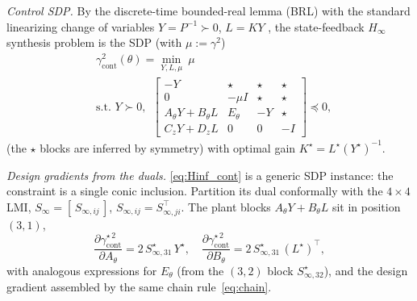 \documentclass[twocolumn,amsthm]{autart}
\begin{document}
\emph{Control SDP.} By the discrete-time bounded-real lemma (BRL) with the standard
linearizing change of variables $Y = P^{-1}\succ 0$, $L = KY$
\cite{boyd1994linear,grigoriadis1998integrate}, the state-feedback $H_\infty$
synthesis problem is the SDP (with $\mu := \gamma^2$)
\begin{equation}\label{eq:Hinf_cont}
\begin{aligned}
&\gamma^2_{\mathrm{cont}}(\theta) = \min_{Y,L,\mu}\ \mu \\
&\text{s.t. }  Y \succ 0,\ \
\begin{bmatrix}
-Y & \star & \star & \star \\
0 & -\mu I & \star & \star \\
A_\theta Y + B_\theta L & E_\theta & -Y & \star \\
C_z Y + D_z L & 0 & 0 & -I
\end{bmatrix} \preceq 0,
\end{aligned}
\end{equation}
(the $\star$ blocks are inferred by symmetry) with optimal gain
$K^\star = L^\star (Y^\star)^{-1}$.

\emph{Design gradients from the duals.} \eqref{eq:Hinf_cont} is a generic SDP
instance: the constraint is a single conic inclusion. Partition its dual
conformally with the $4\times4$ LMI,
$S_{\infty} = [\,S_{\infty,ij}\,]$, $S_{\infty,ij}=S_{\infty,ji}^\top$. The plant blocks
$A_\theta Y + B_\theta L$ sit in position $(3,1)$,
\begin{equation}\label{eq:gradHinf}
\frac{\partial \gamma^{\star\,2}_{\mathrm{cont}}}{\partial A_\theta} = 2\,S_{\infty,31}^\star\,Y^\star,
\quad
\frac{\partial \gamma^{\star\,2}_{\mathrm{cont}}}{\partial B_\theta} = 2\,S_{\infty,31}^\star\,(L^\star)^\top,
\end{equation}
with analogous expressions for $E_\theta$ (from the $(3,2)$ block $S_{\infty,32}^\star$),
and the design gradient assembled by the same chain rule~\eqref{eq:chain}.
\end{document}
